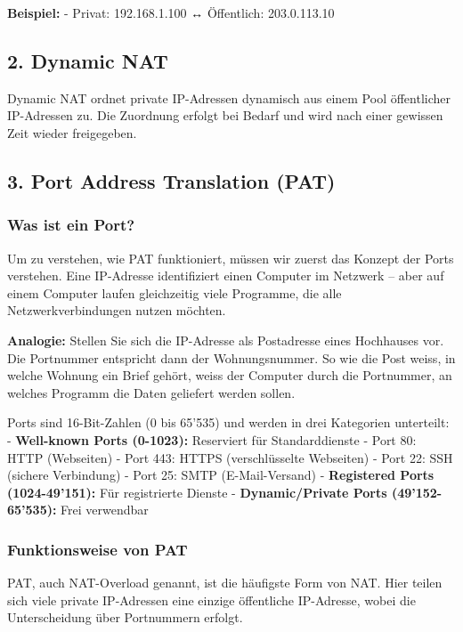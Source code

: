 \documentclass[
  nswissgerman,
  a4paper,
  DIV=11,
  numbers=noendperiod,
  ngerman]{scrreprt}
\begin{document}
\textbf{Beispiel:} - Privat: 192.168.1.100 ↔ Öffentlich: 203.0.113.10

\subsection{2. Dynamic NAT}\label{dynamic-nat}

Dynamic NAT ordnet private IP-Adressen dynamisch aus einem Pool
öffentlicher IP-Adressen zu. Die Zuordnung erfolgt bei Bedarf und wird
nach einer gewissen Zeit wieder freigegeben.

\subsection{3. Port Address Translation
(PAT)}\label{port-address-translation-pat}

\subsubsection{Was ist ein Port?}\label{was-ist-ein-port}

Um zu verstehen, wie PAT funktioniert, müssen wir zuerst das Konzept der
Ports verstehen. Eine IP-Adresse identifiziert einen Computer im
Netzwerk -- aber auf einem Computer laufen gleichzeitig viele Programme,
die alle Netzwerkverbindungen nutzen möchten.

\textbf{Analogie:} Stellen Sie sich die IP-Adresse als Postadresse eines
Hochhauses vor. Die Portnummer entspricht dann der Wohnungsnummer. So
wie die Post weiss, in welche Wohnung ein Brief gehört, weiss der
Computer durch die Portnummer, an welches Programm die Daten geliefert
werden sollen.

Ports sind 16-Bit-Zahlen (0 bis 65'535) und werden in drei Kategorien
unterteilt: - \textbf{Well-known Ports (0-1023):} Reserviert für
Standarddienste - Port 80: HTTP (Webseiten) - Port 443: HTTPS
(verschlüsselte Webseiten) - Port 22: SSH (sichere Verbindung) - Port
25: SMTP (E-Mail-Versand) - \textbf{Registered Ports (1024-49'151):} Für
registrierte Dienste - \textbf{Dynamic/Private Ports (49'152-65'535):}
Frei verwendbar

\subsubsection{Funktionsweise von PAT}\label{funktionsweise-von-pat}

PAT, auch NAT-Overload genannt, ist die häufigste Form von NAT. Hier
teilen sich viele private IP-Adressen eine einzige öffentliche
IP-Adresse, wobei die Unterscheidung über Portnummern erfolgt.
\end{document}
